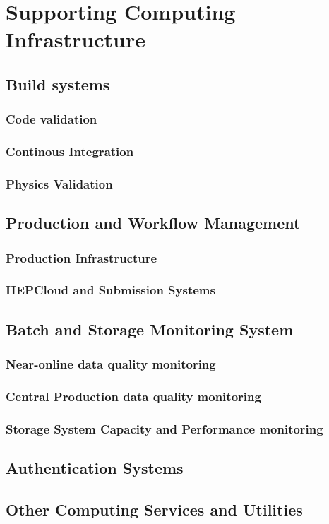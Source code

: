 %
\chapter{Supporting Computing Infrastructure} 
\section{Build systems} %
\subsection{Code validation}
\subsection{Continous Integration}
\subsection{Physics Validation}
\section{Production and Workflow Management} %
\subsection{Production Infrastructure}
\subsection{HEPCloud and Submission Systems}
\section{Batch and Storage Monitoring System} %
\subsection{Near-online data quality monitoring}
\subsection{Central Production data quality monitoring}
\subsection{Storage System Capacity and Performance monitoring}
\section{Authentication Systems}
\section{Other Computing Services and Utilities}
